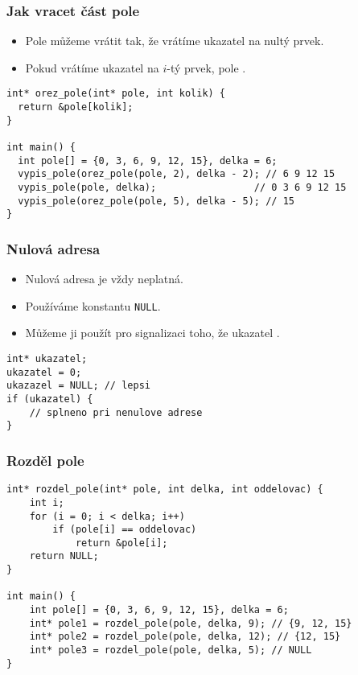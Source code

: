 \documentclass{beamer}
\newenvironment{itemizex}%
  {\large \begin{itemize}%
    \setlength{\itemsep}{8pt}%
    \setlength{\parskip}{8pt}}%
  {\end{itemize}}
\begin{document}
\begin{frame}[t,fragile]\frametitle{Jak vracet část pole} 
    \begin{itemizex}
        \item Pole můžeme vrátit tak, že vrátíme ukazatel na nultý prvek.
        \item Pokud vrátíme ukazatel na $i$-tý prvek, pole .
    \end{itemizex}

    \begin{verbatim} 
int* orez_pole(int* pole, int kolik) {
  return &pole[kolik];
}

int main() {
  int pole[] = {0, 3, 6, 9, 12, 15}, delka = 6;
  vypis_pole(orez_pole(pole, 2), delka - 2); // 6 9 12 15 
  vypis_pole(pole, delka);                 // 0 3 6 9 12 15 
  vypis_pole(orez_pole(pole, 5), delka - 5); // 15 
}
    \end{verbatim}
\end{frame}


\begin{frame}[t,fragile]\frametitle{Nulová adresa} 
    \begin{itemizex}
        \item Nulová adresa je vždy neplatná.
        \item Používáme konstantu \texttt{NULL}.
        \item Můžeme ji použít pro signalizaci toho, že ukazatel .
    \end{itemizex}

\begin{verbatim} 
int* ukazatel;
ukazatel = 0; 
ukazazel = NULL; // lepsi
if (ukazatel) {
    // splneno pri nenulove adrese
}
\end{verbatim}
\end{frame}

\begin{frame}[t,fragile]\frametitle{Rozděl pole} 
\begin{verbatim} 
int* rozdel_pole(int* pole, int delka, int oddelovac) {
    int i;
    for (i = 0; i < delka; i++)
        if (pole[i] == oddelovac)
            return &pole[i];
    return NULL;
}

int main() {
    int pole[] = {0, 3, 6, 9, 12, 15}, delka = 6;
    int* pole1 = rozdel_pole(pole, delka, 9); // {9, 12, 15}
    int* pole2 = rozdel_pole(pole, delka, 12); // {12, 15}
    int* pole3 = rozdel_pole(pole, delka, 5); // NULL
}
\end{verbatim}
\end{frame}
\end{document}
